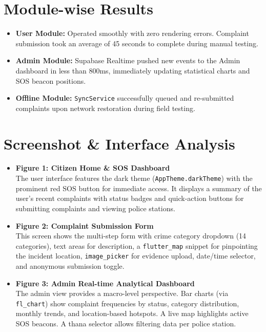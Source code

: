 \documentclass[11pt, a4paper]{report}
\begin{document}
\section{Module-wise Results}
\begin{itemize}
    \item \textbf{User Module:} Operated smoothly with zero rendering errors. Complaint submission took an average of 45 seconds to complete during manual testing.
    \item \textbf{Admin Module:} Supabase Realtime pushed new events to the Admin dashboard in less than 800ms, immediately updating statistical charts and SOS beacon positions.
    \item \textbf{Offline Module:} \texttt{SyncService} successfully queued and re-submitted complaints upon network restoration during field testing.
\end{itemize}

\section{Screenshot \& Interface Analysis}
\begin{itemize}
    \item \textbf{Figure 1: Citizen Home \& SOS Dashboard}\\
    The user interface features the dark theme (\texttt{AppTheme.darkTheme}) with the prominent red SOS button for immediate access. It displays a summary of the user's recent complaints with status badges and quick-action buttons for submitting complaints and viewing police stations.
    
    \item \textbf{Figure 2: Complaint Submission Form}\\
    This screen shows the multi-step form with crime category dropdown (14 categories), text areas for description, a \texttt{flutter\_map} snippet for pinpointing the incident location, \texttt{image\_picker} for evidence upload, date/time selector, and anonymous submission toggle.
    
    \item \textbf{Figure 3: Admin Real-time Analytical Dashboard}\\
    The admin view provides a macro-level perspective. Bar charts (via \texttt{fl\_chart}) show complaint frequencies by status, category distribution, monthly trends, and location-based hotspots. A live map highlights active SOS beacons. A thana selector allows filtering data per police station.
\end{itemize}
\end{document}
